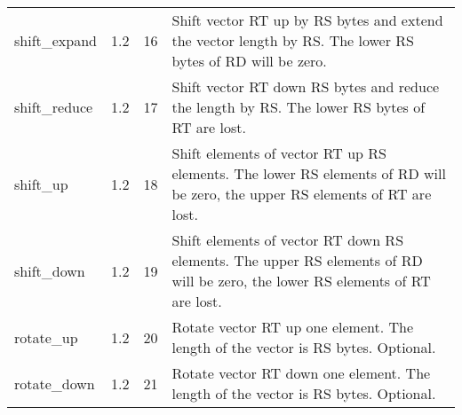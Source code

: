 \documentclass[forwardcom.tex]{subfiles}
\begin{document}
\begin{longtable} {|p{25mm}|p{12mm}|p{12mm}|p{95mm}|}
shift\_expand & 1.2 & 16 & Shift vector RT up by RS bytes and extend the vector length by RS. The lower RS bytes of RD will be zero. \\
shift\_reduce & 1.2 & 17 & Shift vector RT down RS bytes and reduce the length by RS. The lower RS bytes of RT are lost. \\
shift\_up     & 1.2 & 18 & Shift elements of vector RT up RS elements. The lower RS elements of RD will be zero, the upper RS elements of RT are lost. \\
shift\_down   & 1.2 & 19 & Shift elements of vector RT down RS elements. The upper RS
elements of RD will be zero, the lower RS elements of RT are lost. \\
rotate\_up  & 1.2 & 20 & Rotate vector RT up one element. The length of the vector is RS bytes. Optional. \\
rotate\_down  & 1.2 & 21 & Rotate vector RT down one element. The length of the vector is RS bytes. Optional. \\


\end{longtable}
\end{document}
